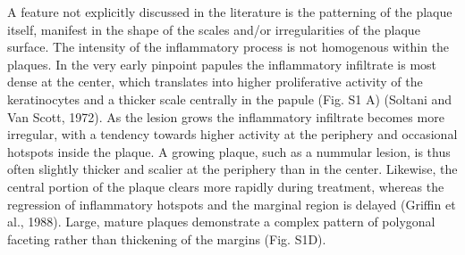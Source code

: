 A feature not explicitly discussed in the literature is the patterning of the plaque itself, manifest in the shape of the scales and/or irregularities of the plaque surface. The intensity of the inflammatory process is not homogenous within the plaques. In the very early pinpoint papules the inflammatory infiltrate is most dense at the center, which translates into higher proliferative activity of the keratinocytes and a thicker scale centrally in the papule (Fig. S1 A) (Soltani and Van Scott, 1972). As the lesion grows the inflammatory infiltrate becomes more irregular, with a tendency towards higher activity at the periphery and occasional hotspots inside the plaque. A growing plaque, such as a nummular lesion, is thus often slightly thicker and scalier at the periphery than in the center. Likewise, the central portion of the plaque clears more rapidly during treatment, whereas the regression of inflammatory hotspots and the marginal region is delayed (Griffin et al., 1988). Large, mature plaques demonstrate a complex pattern of polygonal faceting rather than thickening of the margins (Fig. S1D).

